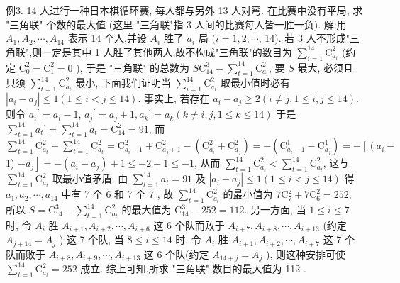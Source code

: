 例3. 14 人进行一种日本棋循环赛, 每人都与另外 13 人对弯.
在比赛中没有平局, 求 "三角联" 个数的最大值 (这里 "三角联"指 3 人间的比赛每人皆一胜一负). 
解:用 $A_1, A_2, \cdots, A_{14}$ 表示 14 个人,并设 $A_i$ 胜了 $a_i$ 局 $(i=1,2, \cdots$, 14). 若 3 人不形成"三角联",则一定是其中 1 人胜了其他两人,故不构成"三角联"的数目为 $\sum_{i=1}^{14} \mathrm{C}_{a_i}^2$ (约定 $\mathrm{C}_0^2=\mathrm{C}_1^2=0$ ), 于是 "三角联" 的总数为 $S \mathrm{C}_{14}^3-\sum_{t=1}^{14} \mathrm{C}_{a_i}^2$, 要 $S$ 最大, 必须且只须 $\sum_{t=1}^{14} \mathrm{C}_{a_t}^2$ 最小, 下面我们证明当 $\sum_{i=1}^{14} \mathrm{C}_{a_i}^2$ 取最小值时必有 $\left|a_i-a_j\right| \leqslant 1(1 \leqslant i<j \leqslant 14)$.
事实上, 若存在 $a_i-a_j \geqslant 2(i \neq j, 1 \leqslant i, j \leqslant 14)$. 则令 $a_i{ }^{\prime}=a_i-1$, $a_j{ }^{\prime}=a_j+1, a_k{ }^{\prime}=a_k(k \neq i, j, 1 \leqslant k \leqslant 14)$ 于是 $\sum_{t=1}^{14} a_t{ }^{\prime}=\sum_{t=1}^{14} a_t=\mathrm{C}_{14}^2=91$, 而 $\sum_{t=1}^{14} \mathrm{C}_{a_t}^2-\sum_{t=1}^{14} \mathrm{C}_{a_t}^2=\mathrm{C}_{a_i-1}^2+\mathrm{C}_{a_j+1}^2-\left(\mathrm{C}_{a_i}^2+\mathrm{C}_{a_j}^2\right)=-\left(\mathrm{C}_{a_i-1}^1-\mathrm{C}_{a_j}^1\right)=-\left[\left(a_i-\right.\right.$ 1) $\left.-a_j\right]=-\left(a_i-a_j\right)+1 \leqslant-2+1 \leqslant-1$, 从而 $\sum_{t=1}^{14} \mathrm{C}_{a_t}^2<\sum_{t=1}^{14} \mathrm{C}_{a_t}^2$, 这与 $\sum_{t=1}^{14} \mathrm{C}_{a_t}^2$ 取最小值矛盾.
由 $\sum_{t=1}^{14} a_t=91$ 及 $\left|a_i-a_j\right| \leqslant 1(1 \leqslant i<j \leqslant 14)$ 得 $a_1, a_2, \cdots, a_{14}$ 中有 7 个 6 和 7 个 7 , 故 $\sum_{t=1}^{14} \mathrm{C}_{a_t}^2$ 的最小值为 $7 \mathrm{C}_7^2+7 \mathrm{C}_6^2=252$, 所以 $S=\mathrm{C}_{14}^3-\sum_{t=1}^{14} \mathrm{C}_{a_t}^2$ 的最大值为 $\mathrm{C}_{14}^3-252=112$.
另一方面, 当 $1 \leqslant i \leqslant 7$ 时, 令 $A_i$ 胜 $A_{i+1}, A_{i+2}, \cdots, A_{i+6}$ 这 6 个队而败于 $A_{i+7}, A_{i+8}, \cdots, A_{i+13}$ (约定 $A_{j+14}=A_j$ ) 这 7 个队, 当 $8 \leqslant i \leqslant 14$ 时, 令 $A_i$ 胜 $A_{i+1}, A_{i+2}, \cdots, A_{i+7}$ 这 7 个队而败于 $A_{i+8}, A_{i+9}, \cdots, A_{i+13}$ 这 6 个队(约定 $A_{14+j}=A_j$ ), 则这种安排可使 $\sum_{t=1}^{14} \mathrm{C}_{a_t}^2=252$ 成立.
综上可知,所求 "三角联" 数目的最大值为 112 .



